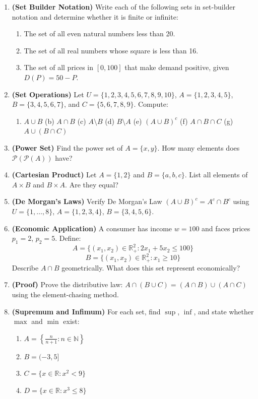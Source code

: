 \documentclass[12pt, a4paper]{article}
\theoremstyle{definition}
\newcommand{\R}{\mathbb{R}}
\newcommand{\N}{\mathbb{N}}
\newcommand{\powerset}{\mathcal{P}}
\begin{document}
\begin{enumerate}[label=\textbf{A\arabic*.}, leftmargin=2.5em]

  \item \textbf{(Set Builder Notation)} Write each of the following sets in set-builder notation and determine whether it is finite or infinite:
  \begin{enumerate}[label=(\alph*)]
    \item The set of all even natural numbers less than 20.
    \item The set of all real numbers whose square is less than 16.
    \item The set of all prices in $[0, 100]$ that make demand positive, given $D(P) = 50 - P$.
  \end{enumerate}

  \item \textbf{(Set Operations)} Let $U = \{1,2,3,4,5,6,7,8,9,10\}$, $A = \{1,2,3,4,5\}$, $B = \{3,4,5,6,7\}$, and $C = \{5,6,7,8,9\}$. Compute:
  \begin{enumerate}[label=(\alph*)]
    \item $A \cup B$ \quad (b) $A \cap B$ \quad (c) $A \setminus B$ \quad (d) $B \setminus A$ \quad (e) $(A \cup B)^c$ \quad (f) $A \cap B \cap C$ \quad (g) $A \cup (B \cap C)$
  \end{enumerate}

  \item \textbf{(Power Set)} Find the power set of $A = \{x, y\}$. How many elements does $\powerset(\powerset(A))$ have?

  \item \textbf{(Cartesian Product)} Let $A = \{1, 2\}$ and $B = \{a, b, c\}$. List all elements of $A \times B$ and $B \times A$. Are they equal?

  \item \textbf{(De Morgan's Laws)} Verify De Morgan's Law $(A \cup B)^c = A^c \cap B^c$ using $U = \{1,\ldots,8\}$, $A=\{1,2,3,4\}$, $B=\{3,4,5,6\}$.

  \item \textbf{(Economic Application)} A consumer has income $w = 100$ and faces prices $p_1 = 2$, $p_2 = 5$. Define:
    \[A = \{(x_1,x_2)\in\R^2_+ : 2x_1 + 5x_2 \leq 100\}\]
    \[B = \{(x_1,x_2)\in\R^2_+ : x_1 \geq 10\}\]
    Describe $A \cap B$ geometrically. What does this set represent economically?

  \item \textbf{(Proof)} Prove the distributive law: $A \cap (B \cup C) = (A \cap B) \cup (A \cap C)$ using the element-chasing method.

  \item \textbf{(Supremum and Infimum)} For each set, find $\sup$, $\inf$, and state whether $\max$ and $\min$ exist:
  \begin{enumerate}[label=(\alph*)]
    \item $A = \left\{\frac{n}{n+1} : n \in \N\right\}$
    \item $B = (-3, 5]$
    \item $C = \{x \in \R : x^2 < 9\}$
    \item $D = \{x \in \R : x^3 \leq 8\}$
  \end{enumerate}
\end{enumerate}
\newpage
\end{document}
